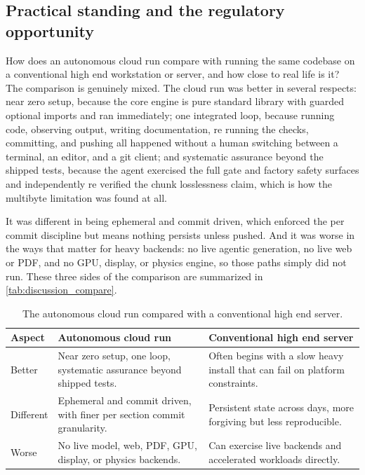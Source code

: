 \subsection{Practical standing and the regulatory opportunity}

How does an autonomous cloud run compare with running the same codebase on a
conventional high end workstation or server, and how close to real life is it?
The comparison is genuinely mixed. The cloud run was better in several respects:
near zero setup, because the core engine is pure standard library with guarded
optional imports and ran immediately; one integrated loop, because running code,
observing output, writing documentation, re running the checks, committing, and
pushing all happened without a human switching between a terminal, an editor, and
a git client; and systematic assurance beyond the shipped tests, because the
agent exercised the full gate and factory safety surfaces and independently re
verified the chunk losslessness claim, which is how the multibyte limitation was
found at all. 

It was different in being ephemeral and commit driven, which
enforced the per commit discipline but means nothing persists unless pushed. And
it was worse in the ways that matter for heavy backends: no live agentic
generation, no live web or PDF, and no GPU, display, or physics engine, so those
paths simply did not run. These three sides of the comparison are summarized in
\autoref{tab:discussion_compare}.

\begin{table}[H]
\caption{The autonomous cloud run compared with a conventional high end server.}
\label{tab:discussion_compare}
\centering
\begin{tabularx}{\textwidth}{L{1.7cm} >{\raggedright\arraybackslash}X >{\raggedright\arraybackslash}X}
\toprule
\textbf{Aspect} & \textbf{Autonomous cloud run} & \textbf{Conventional high end server} \\
\midrule
  Better    & Near zero setup, one loop, systematic assurance beyond shipped tests. & Often begins with a slow heavy install that can fail on platform constraints. \\
  Different & Ephemeral and commit driven, with finer per section commit granularity. & Persistent state across days, more forgiving but less reproducible. \\
  Worse     & No live model, web, PDF, GPU, display, or physics backends. & Can exercise live backends and accelerated workloads directly. \\
\bottomrule
\end{tabularx}
\end{table}

